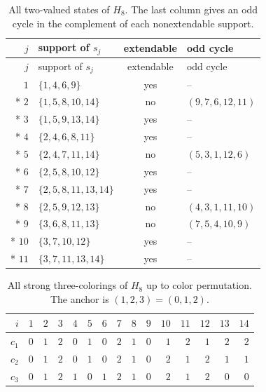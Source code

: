 \documentclass[aps,pra,reprint,superscriptaddress,longbibliography,nofootinbib,floatfix,10pt]{revtex4-2}
\theoremstyle{definition}
\begin{document}
\begingroup\small\setlength{\LTpre}{6pt}\setlength{\LTpost}{8pt}
\begin{longtable}{rlcl}
\caption{All two-valued states of $H_8$. The last column gives an odd cycle in the complement of each nonextendable support.}\label{tab:h8-states}\\
\toprule $j$ & support of $s_j$ & extendable & odd cycle\\\midrule
\endfirsthead
\toprule $j$ & support of $s_j$ & extendable & odd cycle\\\midrule
\endhead
\bottomrule\endfoot
$1$ & $\{1,4,6,9\}$ & yes & -- \\*
$2$ & $\{1,5,8,10,14\}$ & no & $(9,7,6,12,11)$ \\*
$3$ & $\{1,5,9,13,14\}$ & yes & -- \\*
$4$ & $\{2,4,6,8,11\}$ & yes & -- \\*
$5$ & $\{2,4,7,11,14\}$ & no & $(5,3,1,12,6)$ \\*
$6$ & $\{2,5,8,10,12\}$ & yes & -- \\*
$7$ & $\{2,5,8,11,13,14\}$ & yes & -- \\*
$8$ & $\{2,5,9,12,13\}$ & no & $(4,3,1,11,10)$ \\*
$9$ & $\{3,6,8,11,13\}$ & no & $(7,5,4,10,9)$ \\*
$10$ & $\{3,7,10,12\}$ & yes & -- \\*
$11$ & $\{3,7,11,13,14\}$ & yes & -- \\
\end{longtable}\endgroup

\begin{table}[htbp]\centering\small\setlength{\tabcolsep}{3pt}
\caption{All strong three-colorings of $H_8$ up to color permutation. The anchor is $(1,2,3)=(0,1,2)$.}\label{tab:h8-colors}
\begin{tabular}{rrrrrrrrrrrrrrr}
\toprule $i$ & $1$ & $2$ & $3$ & $4$ & $5$ & $6$ & $7$ & $8$ & $9$ & $10$ & $11$ & $12$ & $13$ & $14$\\\midrule
$c_1$ & $0$ & $1$ & $2$ & $0$ & $1$ & $0$ & $2$ & $1$ & $0$ & $1$ & $2$ & $1$ & $2$ & $2$\\
$c_2$ & $0$ & $1$ & $2$ & $0$ & $1$ & $0$ & $2$ & $1$ & $0$ & $2$ & $1$ & $2$ & $1$ & $1$\\
$c_3$ & $0$ & $1$ & $2$ & $1$ & $0$ & $1$ & $2$ & $1$ & $0$ & $2$ & $1$ & $2$ & $0$ & $0$\\
\bottomrule\end{tabular}\end{table}
\end{document}
